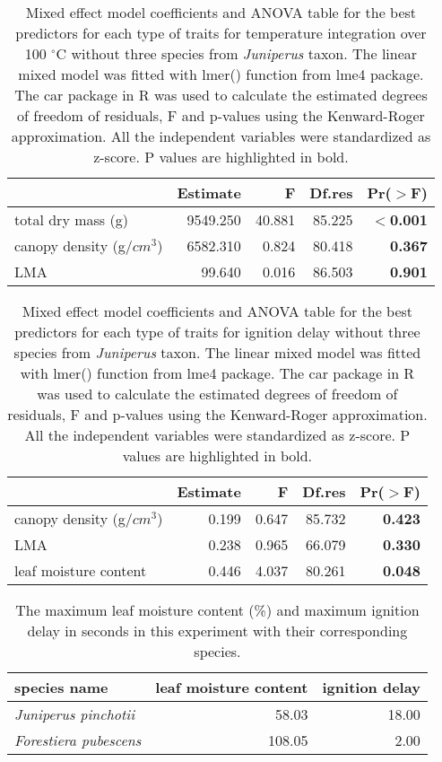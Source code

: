 \documentclass[12pt]{report}
\begin{document}
\begin{table}
\centering
\caption{Mixed effect model coefficients and ANOVA table for the best predictors for each type of traits for temperature integration over 100 $^{\circ}$C without three species from \emph{Juniperus} taxon. The linear mixed model was fitted with lmer() function from lme4 package. The car package in R  was used to calculate the estimated degrees of freedom of residuals, F and p-values using the Kenward-Roger approximation. All the independent variables were standardized  as z-score. P values are highlighted in bold.}
\vspace{0.5 cm}
\begin{tabular}{lrrrr}
  \hline
 &  Estimate & F  & Df.res & Pr($>$F) \\ 
  \hline 
  total dry mass (g) & 9549.250 & 40.881  & 85.225 & \textbf{$<$0.001} \\ 
  canopy density (g/{$cm^3$}) & 6582.310 & 0.824  & 80.418 & \textbf{0.367} \\ 
  LMA & 99.640 & 0.016 &  86.503 & \textbf{0.901} \\ 
   \hline
\end{tabular}
\end{table}



\begin{table}
\centering
\caption{Mixed effect model coefficients and ANOVA table for the best predictors for each type of traits for ignition delay without three species from \emph{Juniperus} taxon. The linear mixed model was fitted with lmer() function from lme4 package. The car package in R  was used to calculate the estimated degrees of freedom of residuals, F and p-values using the Kenward-Roger approximation. All the independent variables were standardized  as z-score. P values are highlighted in bold.}
\vspace{0.5 cm}
\begin{tabular}{lrrrr}
  \hline
 &  Estimate & F  & Df.res & Pr($>$F) \\ 
  \hline 
  canopy density (g/{$cm^3$}) & 0.199 &  0.647 & 85.732 & \textbf{0.423} \\ 
  LMA  & 0.238 & 0.965 & 66.079 & \textbf{0.330} \\ 
  leaf moisture content & 0.446 & 4.037 & 80.261  & \textbf{0.048} \\ 
   \hline
\end{tabular}
\end{table}

\begin{table}[ht]
\centering
\caption{The maximum leaf moisture content (\%) and maximum ignition delay in seconds in this experiment with their corresponding species.}
\begin{tabular}{lrr}
  \hline
  \textbf{species name} & \textbf{leaf moisture content} & \textbf{ignition delay} \\ 
  \hline
  \emph{Juniperus pinchotii} & 58.03 & 18.00 \\ 
  \emph{Forestiera pubescens} & 108.05 & 2.00 \\ 
   \hline
\end{tabular}
\end{table}
\end{document}
